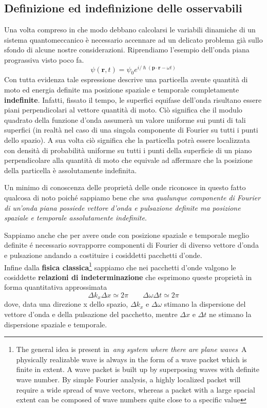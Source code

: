 \subsection{Definizione ed indefinizione delle osservabili}\label{sec:definizione-ed-indefinizione-delle-osservabili}

Una volta compreso in che modo debbano calcolarsi le variabili dinamiche
di un sistema quantomeccanico è necessario accennare ad un delicato
problema già sullo sfondo di alcune nostre considerazioni.
Riprendiamo
l'esempio dell'onda piana prograssiva visto poco fa. \[
	\psi(\bm{r},t) = \psi_{0}e^{ i/\hslash (\bm{p}\cdot \bm{r}- \omega t)}
\] Con tutta evidenza tale espressione descrive una particella avente
quantità di moto ed energia definite ma posizione spaziale e temporale
completamente \textbf{indefinite}.
Infatti, fissato il tempo, le
superfici equifase dell'onda risultano essere piani perpendicolari al
vettore quantità di moto.
Ciò significa che il modulo quadrato della
funzione d'onda assumerà un valore uniforme sui punti di tali superfici
(in realtà nel caso di una singola componente di Fourier su tutti i
punti dello spazio).
A sua volta ciò significa che la particella potrà
essere localizzata con densità di probabilità uniforme su tutti i punti
della superficie di un piano perpendicolare alla quantità di moto che
equivale ad affermare che la posizione della particella è assolutamente
indefinita.

Un minimo di conoscenza delle proprietà delle onde riconosce in questo
fatto qualcosa di noto poiché sappiamo bene che \emph{una qualunque
	componente di Fourier di un'onda piana possiede vettore d'onda e
	pulsazione definite ma posizione spaziale e temporale assolutamente
	indefinite}.

Sappiamo anche che per avere onde con posizione spaziale e temporale
meglio definite é necessario sovrapporre componenti di Fourier di
diverso vettore d'onda e pulsazione andando a costituire i cosiddetti
pacchetti d'onde.\\
Infine dalla \textbf{fisica classica}\footnote{The general idea is
	present in~\emph{any system where there are plane waves}~A physically
	realizable wave is always in the form of a wave packet which is finite
	in extent. A wave packet is built up by superposing waves with
	definite wave number. By simple Fourier analysis, a highly localized
	packet will require a wide spread of wave vectors, whereas a packet
	with a large spacial extent can be composed of wave numbers quite
	close to a specific value} sappiamo che nei pacchetti d'onde valgono
le cosiddette \textbf{relazioni di indeterminazione} che esprimono
queste proprietà in forma quantitativa approssimata \[
	\Delta k_{x} \Delta x \simeq2 \pi \qquad \Delta \omega \Delta t \simeq2 \pi
\] dove, data una direzione x dello spazio, \(\Delta k_{x}\) e
\(\Delta \omega\) stimano la dispersione del vettore d'onda e della
pulsazione del pacchetto, mentre \(\Delta x\) e \(\Delta t\) ne stimano
la dispersione spaziale e temporale.

